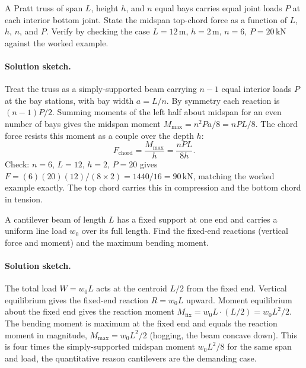 \begin{exercise}
A Pratt truss of span $L$, height $h$, and $n$ equal bays carries
equal joint loads $P$ at each interior bottom joint. State the
midspan top-chord force as a function of $L$, $h$, $n$, and $P$.
Verify by checking the case $L = 12\,\si{\meter}$, $h = 2\,\si{\meter}$,
$n = 6$, $P = 20\,\text{kN}$ against the worked example.

\paragraph{Solution sketch.} Treat the truss as a simply-supported
beam carrying $n-1$ equal interior loads $P$ at the bay stations, with
bay width $a = L/n$. By symmetry each reaction is $(n-1)P/2$. Summing
moments of the left half about midspan for an even number of bays gives
the midspan moment $M_{\max} = n^2 P a / 8 = n P L / 8$. The chord force
resists this moment as a couple over the depth $h$:
\[
F_{\text{chord}} = \frac{M_{\max}}{h} = \frac{n P L}{8 h}.
\]
Check: $n = 6$, $L = 12$, $h = 2$, $P = 20$ gives
$F = (6)(20)(12)/(8 \times 2) = 1440/16 = 90\,\text{kN}$, matching the
worked example exactly. The top chord carries this in compression and
the bottom chord in tension.
\end{exercise}

\begin{exercise}
A cantilever beam of length $L$ has a fixed support at one end and
carries a uniform line load $w_0$ over its full length. Find the
fixed-end reactions (vertical force and moment) and the maximum
bending moment.

\paragraph{Solution sketch.} The total load $W = w_0 L$ acts at the
centroid $L/2$ from the fixed end. Vertical equilibrium gives the
fixed-end reaction $R = w_0 L$ upward. Moment equilibrium about the
fixed end gives the reaction moment $M_{\text{fix}} = w_0 L \cdot (L/2)
= w_0 L^2 / 2$. The bending moment is maximum at the fixed end and
equals the reaction moment in magnitude, $M_{\max} = w_0 L^2 / 2$
(hogging, the beam concave down). This is four times the
simply-supported midspan moment $w_0 L^2/8$ for the same span and load,
the quantitative reason cantilevers are the demanding case.
\end{exercise}

